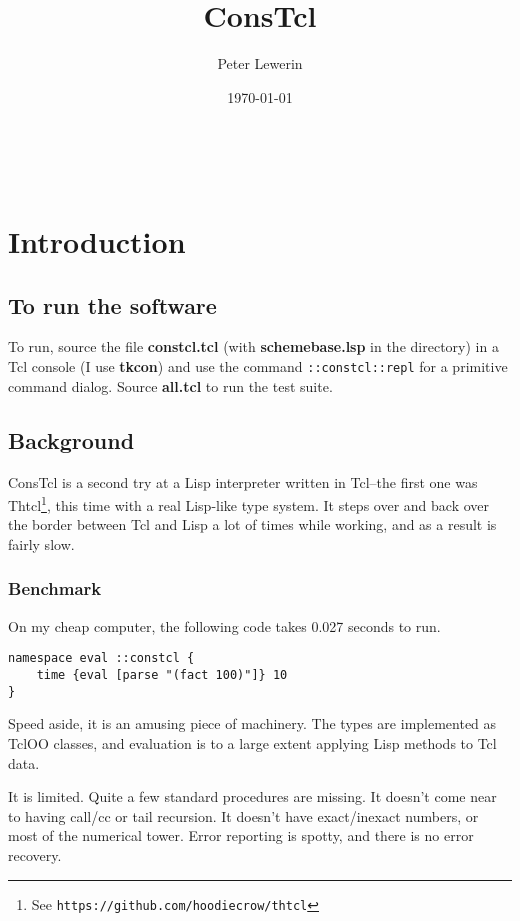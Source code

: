 \documentclass{report}
\title{ConsTcl}
\author{Peter Lewerin}
\date{\today}
\begin{document}
\maketitle
\tableofcontents
 
\section{Introduction}
\label{introduction}
\subsection{To run the software}
\label{to-run-the-software}

To run, source the file \textbf{constcl.tcl} (with \textbf{schemebase.lsp} in the directory) in a Tcl console (I use \textbf{tkcon}) and use the command \texttt{::constcl::repl} for a primitive command dialog. Source \textbf{all.tcl} to run the test suite.

\subsection{Background}
\label{background}

ConsTcl is a second try at a Lisp interpreter written in Tcl--the first one was Thtcl\footnote{See \texttt{https://github.com/hoodiecrow/thtcl}}, this time with a real Lisp-like type system. It steps over and back over the border between Tcl and Lisp a lot of times while working, and as a result is fairly slow.

\subsubsection{Benchmark}
\label{benchmark}

On my cheap computer, the following code takes 0.027 seconds to run.

\noindent\makebox[\linewidth]{\rule{\linewidth}{0.4pt}}
\begin{lstlisting}
namespace eval ::constcl {
    time {eval [parse "(fact 100)"]} 10
}
\end{lstlisting}
\noindent\makebox[\linewidth]{\rule{\linewidth}{0.4pt}}

Speed aside, it is an amusing piece of machinery. The types are implemented as TclOO classes, and evaluation is to a large extent applying Lisp methods to Tcl data.


It is limited. Quite a few standard procedures are missing. It doesn't come near to having call/cc or tail recursion. It doesn't have exact/inexact numbers, or most of the numerical tower. Error reporting is spotty, and there is no error recovery.
\end{document}
